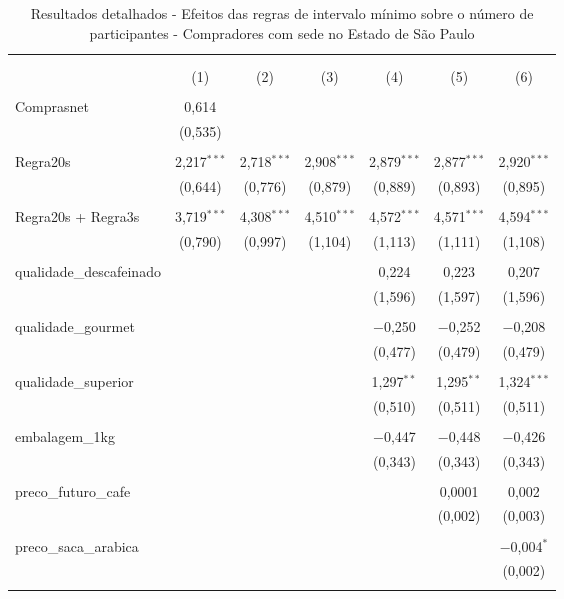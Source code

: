 \setlength{\tabcolsep}{2pt}
\begin{table}[!htbp]
\centering
\small
\begin{threeparttable}
\centering 
  \caption{Resultados detalhados - Efeitos das regras de intervalo mínimo sobre o número de participantes - Compradores com sede no Estado de São Paulo} 
  \label{dd_results_participantes_sp} 
\begin{tabular}{lcccccc} 
\\[-1.8ex]\hline 
\hline \\[-1.8ex] 
\\[-1.8ex] & (1) & (2) & (3) & (4) & (5) & (6) \\ 
\hline \\[-1.8ex] 

Comprasnet & 0,614 &  &  &  &  &  \\ 
  & (0,535) &  &  &  &  & \\ 
  & & & & & & \\ 

 Regra20s & 2,217$^{***}$ & 2,718$^{***}$ & 2,908$^{***}$ & 2,879$^{***}$ & 2,877$^{***}$ & 2,920$^{***}$ \\ 
  & (0,644) & (0,776) & (0,879) & (0,889) & (0,893) & (0,895) \\ 
  & & & & & & \\ 
 Regra20s + Regra3s & 3,719$^{***}$ & 4,308$^{***}$ & 4,510$^{***}$ & 4,572$^{***}$ & 4,571$^{***}$ & 4,594$^{***}$ \\ 
  & (0,790) & (0,997) & (1,104) & (1,113) & (1,111) & (1,108) \\ 
  & & & & & & \\ 

 qualidade\_descafeinado &  &  &  & 0,224 & 0,223 & 0,207 \\ 
  &  &  &  & (1,596) & (1,597) & (1,596) \\ 
  & & & & & & \\ 
 qualidade\_gourmet &  &  &  & $-$0,250 & $-$0,252 & $-$0,208 \\ 
  &  &  &  & (0,477) & (0,479) & (0,479) \\ 
  & & & & & & \\ 
 qualidade\_superior &  &  &  & 1,297$^{**}$ & 1,295$^{**}$ & 1,324$^{***}$ \\ 
  &  &  &  & (0,510) & (0,511) & (0,511) \\ 
  & & & & & & \\ 
 embalagem\_1kg &  &  &  & $-$0,447 & $-$0,448 & $-$0,426 \\ 
  &  &  &  & (0,343) & (0,343) & (0,343) \\ 
  & & & & & & \\ 
 preco\_futuro\_cafe &  &  &  &  & 0,0001 & 0,002 \\ 
  &  &  &  &  & (0,002) & (0,003) \\ 
  & & & & & & \\ 
 preco\_saca\_arabica &  &  &  &  &  & $-$0,004$^{*}$ \\ 
  &  &  &  &  &  & (0,002) \\ 
  & & & & & & \\ 


\end{tabular}
\end{threeparttable}
\end{table}
